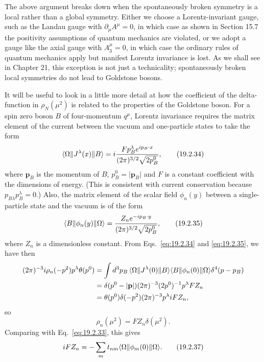 The above argument breaks down when the spontaneously broken symmetry is a
local rather than a global symmetry. Either we choose a Lorentz-invariant
gauge, such as the Landau gauge with $\partial_\mu A^\mu=0$, in which case as
shown in Section 15.7 the positivity assumptions of quantum mechanics are
violated, or we adopt a gauge like the axial gauge with $A^\mu_3=0$, in which
case the ordinary rules of quantum mechanics apply but manifest Lorentz
invariance is lost. As we shall see in Chapter 21, this exception is not just
a technicality; spontaneously broken local symmetries do not lead to
Goldstone bosons.

It will be useful to look in a little more detail at how the coefficient of
the delta-function in $\rho_N(\mu^2)$ is related to the properties of the
Goldstone boson. For a spin zero boson $B$ of four-momentum $q^\mu$, Lorentz
invariance requires the matrix element of the current between the vacuum and
one-particle states to take the form
\begin{equation}
 \langle \Omega\rVert J^\lambda(x)\lVert B\rangle
 =i\frac{Fp_B^\lambda e^{ip_B\cdot x}}
 {(2\pi)^{3/2}\sqrt{2p_B^0}},
 \tag{19.2.34}\label{eq:19.2.34}
\end{equation}
where $\mathbf p_B$ is the momentum of $B$, $p_B^0=\lvert\mathbf p_B\rvert$
and $F$ is a constant coefficient with the dimensions of energy. (This is
consistent with current conservation because $p_{B\lambda}p_B^\lambda=0$.)
Also, the matrix element of the scalar field $\phi_n(y)$ between a
single-particle state and the vacuum is of the form
\begin{equation}
 \langle B\rVert\phi_n(y)\lVert \Omega\rangle
 =\frac{Z_ne^{-ip_B\cdot y}}
 {(2\pi)^{3/2}\sqrt{2p_B^0}},
 \tag{19.2.35}\label{eq:19.2.35}
\end{equation}
where $Z_n$ is a dimensionless constant. From Eqs.~\eqref{eq:19.2.34} and
\eqref{eq:19.2.35}, we have then
\begin{align*}
 (2\pi)^{-3}i\rho_n(-p^2)p^\lambda\theta(p^0)
 &=
 \int d^3p_B\,
 \langle \Omega\rVert J^\lambda(0)\lVert B\rangle
 \langle B\rVert\phi_n(0)\lVert \Omega\rangle\delta^4(p-p_B)
 \\
 &=
 \delta(p^0-\lvert\mathbf p\rvert)(2\pi)^{-3}
 (2p^0)^{-1}p^\lambda FZ_n
 \\
 &=
 \theta(p^0)\delta(-p^2)(2\pi)^{-3}p^\lambda iFZ_n,
\end{align*}
so
\begin{equation}
 \rho_n(\mu^2)=FZ_n\delta(\mu^2).
 \tag{19.2.36}\label{eq:19.2.36}
\end{equation}
Comparing with Eq.~\eqref{eq:19.2.33}, this gives
\begin{equation}
 iFZ_n=-\sum_m t_{nm}\langle \Omega\rVert\phi_m(0)\lVert \Omega\rangle.
 \tag{19.2.37}\label{eq:19.2.37}
\end{equation}

